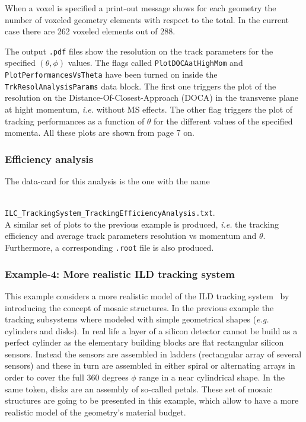 When a voxel is specified a print-out message shows for each geometry the number of voxeled geometry elements with respect to the total. In the current case there are 262 voxeled elements 
out of 288.

The output {\tt .pdf} files show the resolution on the track parameters for the specified $(\theta,\phi)$ values. The flags called {\tt PlotDOCAatHighMom} and {\tt PlotPerformancesVsTheta} 
have been turned on inside the {\tt TrkResolAnalysisParams} data block. The first one triggers the plot of the resolution on the Distance-Of-Closest-Approach (DOCA) in the transverse plane 
at hight momentum, {\it i.e.} without MS effects. The other flag triggers the plot of tracking performances as a function of $\theta$ for the different values of the specified momenta. All 
these plots are shown from page 7 on.

\subsubsection*{Efficiency analysis}

The data-card for this analysis is the one with the name

~\\
{\small {\tt ILC\_TrackingSystem\_TrackingEfficiencyAnalysis.txt}}.
~\\

\noindent
A similar set of plots to the previous example is produced, {\it i.e.} the tracking efficiency and average track parameters resolution vs momentum and $\theta$. Furthermore, a corresponding 
{\tt .root} file is also produced.


\subsubsection{Example-4: More realistic ILD tracking system}
\label{subsubsec:Example4}

This example considers a more realistic model of the ILD tracking system~\cite{bib:ILDcoll} by introducing the concept of mosaic structures. In the previous example the 
tracking subsystems where modeled with simple geometrical shapes ({\it e.g.} cylinders and disks). In real life a layer of a silicon detector cannot be build as a perfect 
cylinder as the elementary building blocks are flat rectangular silicon sensors. Instead the sensors are assembled in ladders (rectangular array of 
several sensors) and these in turn are assembled in either spiral or alternating arrays in order to cover the full 360 degrees $\phi$ range in a near cylindrical shape. 
In the same token, disks are an assembly of so-called petals. These set of mosaic structures are going to be presented in this example, which allow to have a more realistic 
model of the geometry's material budget.


